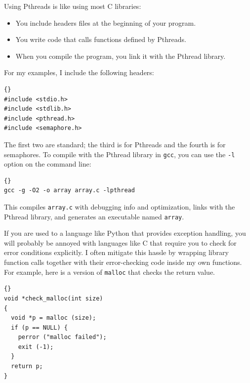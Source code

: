 \documentclass{book}
\begin{document}
Using Pthreads is like using most C libraries:

\begin{itemize}

\item You include headers files at the beginning of your
program.

\item You write code that calls functions defined by Pthreads.

\item When you compile the program, you link it with the
Pthread library.

\end{itemize}

For my examples, I include the following headers:

\begin{latin}
\begin{lstlisting}[title={Headers}]{}
#include <stdio.h>
#include <stdlib.h>
#include <pthread.h>
#include <semaphore.h>
\end{lstlisting}
\end{latin}

The first two are standard; the third is for Pthreads and
the fourth is for semaphores.
To compile with the Pthread library in {\tt gcc}, you
can use the {\tt -l}
option on the command line:

\begin{latin}
\begin{lstlisting}[title={}]{}
gcc -g -O2 -o array array.c -lpthread
\end{lstlisting}
\end{latin}

This compiles {\tt array.c} with debugging info and optimization,
links with the Pthread library, and generates an executable
named {\tt array}.

If you are used to a language like Python that provides exception
handling, you will probably be annoyed with languages like C that
require you to check for error conditions explicitly.  I often
mitigate this hassle by wrapping library function calls
together with their error-checking code inside my own functions.
For example, here is a version of {\tt malloc}
that checks the return value.

\begin{latin}
\begin{lstlisting}[title={}]{}
void *check_malloc(int size)
{
  void *p = malloc (size);
  if (p == NULL) {
    perror ("malloc failed");
    exit (-1);
  }
  return p;
}
\end{lstlisting}
\end{latin}
\end{document}
